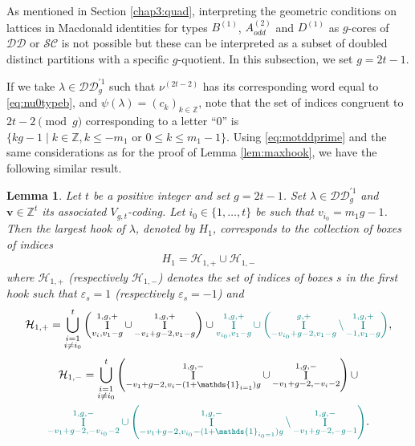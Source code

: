 \documentclass[11pt,letterpaper]{amsart}
\def\bbbz{\mathbb Z}
\def\cch{\mathcal H}
\def\ccsc{\mathcal {SC}}
\def\ccdd{\mathcal {DD}}
\newtheorem{lm}[df]{Lemma}
\DeclareMathOperator{\I}{I}
\numberwithin{equation}{section}
\numberwithin{df}{section}
\begin{document}
As mentioned in Section \ref{chap3:quad}, interpreting the geometric conditions on lattices in Macdonald identities for types $B^{(1)}$, $A^{(2)}_{odd}$ and $D^{(1)}$ as $g$-cores of $\ccdd$ or $\ccsc$ is not possible but these can be interpreted as a subset of doubled distinct partitions with a specific $g$-quotient. In this subsection, we set $g=2t-1$.

If we take $\lambda\in\ccdd_{g}^{'1}$ such that $\nu^{(2t-2)}$ has its corresponding word equal to \eqref{eq:nu0typeb}, and $\psi(\lambda)=(c_k)_{k\in\bbbz}$, note that the set of indices congruent to $2t-2\pmod{g}$ corresponding to a letter ``$0$'' is $\lbrace kg-1 \mid k\in\bbbz, k\leq -m_1 \text{ or } 0\leq k\leq m_1-1\rbrace$. Using \eqref{eq:motddprime} and the same considerations as for the proof of Lemma \ref{lem:maxhook}, we have the following similar result.
\begin{lm}\label{lem:maxhookddprimeimpair}
Let $t$ be a positive integer and set $g=2t-1$. Set $\lambda\in \ccdd_{g}^{'1}$ and $\mathbf{v}\in\bbbz^{t}$ its associated $V_{g,t}$-coding. Let $i_0\in\lbrace 1,\dots,t\rbrace$ be such that $v_{i_0}=m_1g-1$.
Then the largest hook of $\lambda$, denoted by $H_1$, corresponds to the collection of boxes of indices 
\begin{align*}
H_1=\cch_{1,+}\cup\cch_{1,-}
\end{align*}
where $\cch_{1,+}$ (respectively $\cch_{1,-}$) denotes the set of indices of boxes $s$ in the first hook such that $\varepsilon_s=1$ (respectively $\varepsilon_s=-1$) and
\begin{multline*}
\cch_{1,+}= \displaystyle\bigcup_{\substack{i=1\\i\neq i_0}}^{t}\left(\I_{v_i,v_1-g}^{1,g,+}\cup \I_{-v_i+g-2,v_1-g}^{1,g,+}\right)\cup\textcolor{teal}{\I_{v_{i_0},v_1-g}^{1,g,+}\cup \left(\I_{-v_{i_0}+g-2,v_1-g}^{g,+}\setminus \I_{-1,v_1-g}^{1,g,+}\right)} ,
 \end{multline*}
 \begin{multline*}
\cch_{1,-}= \displaystyle\bigcup_{\substack{i=1\\i\neq i_0}}^{t}\left(\I_{-v_1+g-2,v_i-(1+\mathds{1}_{i=1})g}^{1,g,-}\cup \I_{-v_1+g-2,-v_i-2}^{1,g,-}\right)\cup\\ \textcolor{teal}{\I_{-v_1+g-2,-v_{i_0}-2}^{1,g,-}\cup\left(\I_{-v_1+g-2,v_{i_0}-(1+\mathds{1}_{i_0=1})g}^{1,g,-}\setminus \I_{-v_1+g-2,-g-1}^{1,g,-}\right)} .
\end{multline*}
\end{lm}
\end{document}
